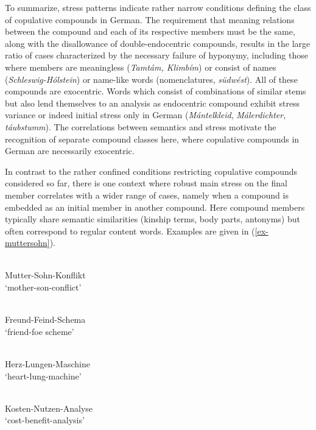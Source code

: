 \documentclass[output=paper
 ,nobabel
 ,draftmode
 ,colorlinks, citecolor=brown
]{langscibook}
\begin{document}
\noindent
To summarize, stress patterns indicate rather narrow conditions defining the class of copulative
compounds in German. The requirement that meaning relations between the compound and each of its
respective members must be the same, along with the disallowance of double-endocentric compounds,
results in the large ratio of cases characterized by the necessary failure of hyponymy, including
those where members are meaningless (\emph{Tamtám, Klimbím}) or consist of names
(\emph{Schleswig-Hólstein}) or name-like words (nomenclatures, \eg \emph{südwést}). All of these
compounds are exocentric. Words which consist of combinations of similar stems but also lend
themselves to an analysis as endocentric compound exhibit stress variance or indeed initial stress
only in German (\eg \emph{Mántelkleid}, \emph{Málerdichter}, \emph{táubstumm}). The correlations
between semantics and stress motivate the recognition of separate compound classes here, where
copulative compounds in German are necessarily exocentric. 
 
 In contrast to the rather confined conditions restricting copulative compounds considered so far,
 there is one context where robust main stress on the final member correlates with a wider range of
 cases, namely when a compound is embedded as an initial member in another compound. Here compound
 members typically share semantic similarities (\eg kinship terms, body parts, antonyms) but often
 correspond to regular content words. Examples are given in (\ref{ex-muttersohn}).  
 


\eal\label{ex-muttersohn}
\\
Mutter-Sohn-Konflikt\\
`mother-son-conflict'

\\
Freund-Feind-Schema\\
`friend-foe scheme'

\\
Herz-Lungen-Maschine\\
`heart-lung-machine'

\\
Kosten-Nutzen-Analyse\\
`cost-benefit-analysis'
\end{document}
